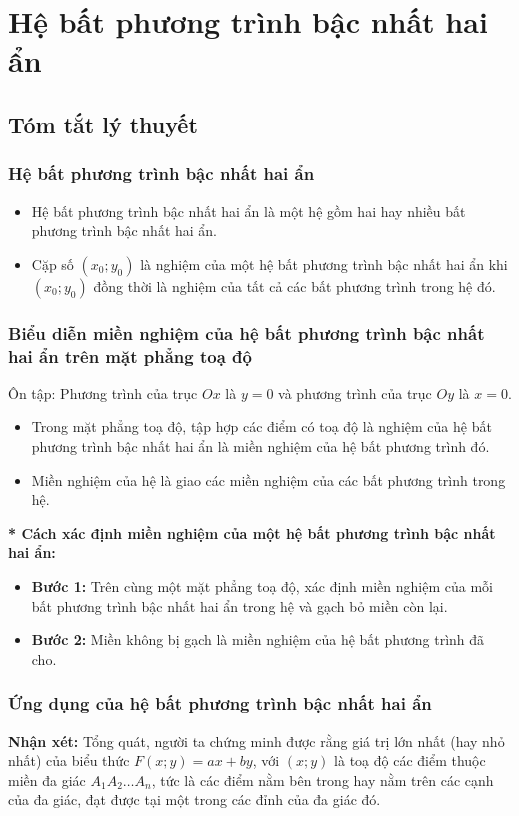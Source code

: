 \section{Hệ bất phương trình bậc nhất hai ẩn}
\setcounter{dang}{0}
\subsection{Tóm tắt lý thuyết}

\subsubsection{Hệ bất phương trình bậc nhất hai ẩn}
\begin{itemize}
	\item  Hệ bất phương trình bậc nhất hai ẩn là một hệ gồm hai hay nhiều bất phương trình bậc nhất hai ẩn.
	\item  Cặp số $\left(x_{0} ; y_{0}\right)$ là nghiệm của một hệ bất phương trình bậc nhất hai ẩn khi $\left(x_{0} ; y_{0}\right)$ đồng thời là nghiệm của tất cả các bất phương trình trong hệ đó.
\end{itemize}
\subsubsection{Biểu diễn miền nghiệm của hệ bất phương trình bậc nhất hai ẩn trên mặt phẳng toạ độ}
\begin{note} 
Ôn tập: Phương trình của trục $Ox$ là $y=0$ và phương trình của trục $Oy$ là $x=0$.
\end{note}
\begin{itemize}
	\item Trong mặt phẳng toạ độ, tập hợp các điểm có toạ độ là nghiệm của hệ bất phương trình bậc nhất hai ẩn là miền nghiệm của hệ bất phương trình đó.
	\item Miền nghiệm của hệ là giao các miền nghiệm của các bất phương trình trong hệ.
\end{itemize}
\textbf{* Cách xác định miền nghiệm của một hệ bất phương trình bậc nhất hai ẩn:}
\begin{itemize}
	\item{\bf Bước 1:}  Trên cùng một mặt phẳng toạ độ, xác định miền nghiệm của mỗi bất phương trình bậc nhất hai ẩn trong hệ và gạch bỏ miền còn lại.
	\item{\bf Bước 2:}  Miền không bị gạch là miền nghiệm của hệ bất phương trình đã cho.
\end{itemize}
\subsubsection{Ứng dụng của hệ bất phương trình bậc nhất hai ẩn}
\textbf{Nhận xét:} Tổng quát, người ta chứng minh được rằng giá trị lớn nhất (hay nhỏ nhất) của biểu thức $F(x ; y)=a x+b y$, với $(x ; y)$ là toạ độ các điểm thuộc miền đa giác $A_{1} A_{2} \ldots A_{n}$, tức là các điểm nằm bên trong hay nằm trên các cạnh của đa giác, đạt được tại một trong các đỉnh của đa giác đó.
